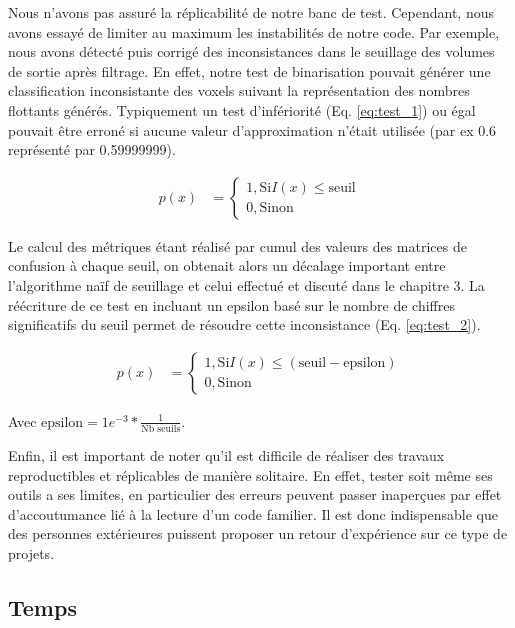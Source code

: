 Nous n'avons pas assuré la réplicabilité de notre banc de test. Cependant, nous avons essayé de limiter au maximum les instabilités de notre code. Par exemple, nous avons détecté puis corrigé des inconsistances dans le seuillage des volumes de sortie après filtrage. En effet, notre test de binarisation pouvait générer une classification inconsistante des voxels suivant la représentation des nombres flottants générés. Typiquement un test d’infériorité (Eq. \ref{eq:test_1}) ou égal pouvait être erroné si aucune valeur d’approximation n'était utilisée (par ex 0.6 représenté par 0.59999999).

\begin{align}
    p(x) &=
    \begin{cases}
        1, \text{Si} I(x) \leq \text{seuil} \\
        0, \text{Sinon}
    \end{cases}
    \label{eq:test_1}
\end{align}
 
Le calcul des métriques étant réalisé par cumul des valeurs des matrices de confusion à chaque seuil, on obtenait alors un décalage important entre l'algorithme naïf de seuillage et celui effectué et discuté dans le chapitre 3. La réécriture de ce test en incluant un epsilon basé sur le nombre de chiffres significatifs du seuil permet de résoudre cette inconsistance (Eq. \ref{eq:test_2}).
 
 \begin{align}
    p(x) &=
    \begin{cases}
        1, \text{Si} I(x) \leq (\text{seuil} - \text{epsilon}) \\
        0, \text{Sinon}
    \end{cases}
    \label{eq:test_2}
\end{align}
 
 Avec $\text{epsilon} = 1e^{-3} * \frac{1}{ \text{Nb seuils} }$.

Enfin, il est important de noter qu'il est difficile de réaliser des travaux reproductibles et réplicables de manière solitaire. En effet, tester soit même ses outils a ses limites, en particulier des erreurs peuvent passer inaperçues par effet d'accoutumance lié à la lecture d'un code familier. Il est donc indispensable que des personnes extérieures puissent proposer un retour d'expérience sur ce type de projets.

\subsection{Temps}

